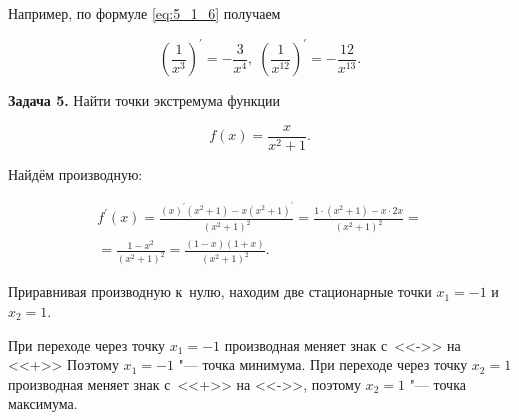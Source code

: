 Например, по формуле \eqref{eq:5_1_6} получаем

\begin{equation*}
\displaystyle
\left( \frac{1}{x^{3}} \right)^\prime = -\frac{3}{x^{4}}, \;
\left( \frac{1}{x^{12}} \right)^\prime = -\frac{12}{x^{13}}.
\end{equation*}

\textbf{Задача 5.}\label{ex:5_1_5} Найти точки экстремума функции

\begin{equation*}
\displaystyle f(x) = \frac{x}{x^{2} + 1}.
\end{equation*}

Найдём производную:

\begin{multline*}
\displaystyle
f^\prime(x) = 
\frac
{(x)^\prime \left( x^{2} + 1 \right)- x\left( x^{2} + 1 \right)^\prime}
{\left( x^{2} + 1 \right)^{2}} = 
\frac{1 \cdot \left( x^{2} + 1 \right) - x \cdot 2x}{\left( x^{2} + 1 \right)^{2}} = \\
= \frac{1 - x^{2}}{\left( x^{2} + 1 \right)^{2}} = 
\frac{(1 - x)(1 + x)}{\left( x^{2} + 1 \right)^{2}}.
\end{multline*}

Приравнивая производную к~нулю, находим две стационарные точки
$x_{1} = -1$ и~$x_{2} = 1$.

При переходе через точку $x_{1} = -1$ производная меняет знак с~<<->> на <<+>>
Поэтому $x_{1} = -1$ "--- точка минимума. При переходе через точку $x_{2} = 1$
производная меняет знак с~<<+>> на <<->>, поэтому $x_{2} = 1$ "--- точка максимума.
